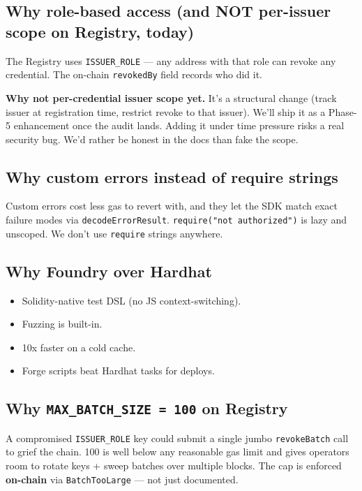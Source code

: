 \documentclass[11pt,a4paper]{article}
\begin{document}
\subsection{Why role-based access (and NOT per-issuer scope on Registry, today)}

The Registry uses \texttt{ISSUER\_ROLE} --- any address with that role can revoke any credential. The on-chain \texttt{revokedBy} field records who did it.

\textbf{Why not per-credential issuer scope yet.} It's a structural change (track issuer at registration time, restrict revoke to that issuer). We'll ship it as a Phase-5 enhancement once the audit lands. Adding it under time pressure risks a real security bug. We'd rather be honest in the docs than fake the scope.

\subsection{Why custom errors instead of require strings}

Custom errors cost less gas to revert with, and they let the SDK match exact failure modes via \texttt{decodeErrorResult}. \texttt{require("not authorized")} is lazy and unscoped. We don't use \texttt{require} strings anywhere.

\subsection{Why Foundry over Hardhat}

\begin{itemize}[leftmargin=*, nosep]
  \item Solidity-native test DSL (no JS context-switching).
  \item Fuzzing is built-in.
  \item 10x faster on a cold cache.
  \item Forge scripts beat Hardhat tasks for deploys.
\end{itemize}

\subsection{Why \texttt{MAX\_BATCH\_SIZE = 100} on Registry}

A compromised \texttt{ISSUER\_ROLE} key could submit a single jumbo \texttt{revokeBatch} call to grief the chain. 100 is well below any reasonable gas limit and gives operators room to rotate keys + sweep batches over multiple blocks. The cap is enforced \textbf{on-chain} via \texttt{BatchTooLarge} --- not just documented.
\end{document}

